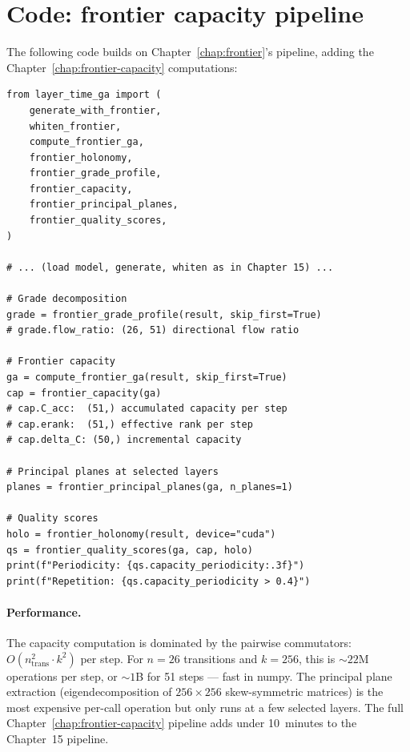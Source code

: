 \documentclass[11pt, twoside, openright]{memoir}
\numberwithin{equation}{chapter}
\begin{document}
\section{Code: frontier capacity pipeline}
\label{sec:cap-code}

The following code builds on Chapter~\ref{chap:frontier}'s
pipeline, adding the Chapter~\ref{chap:frontier-capacity} computations:

\begin{lstlisting}[caption={Frontier capacity pipeline}]
from layer_time_ga import (
    generate_with_frontier,
    whiten_frontier,
    compute_frontier_ga,
    frontier_holonomy,
    frontier_grade_profile,
    frontier_capacity,
    frontier_principal_planes,
    frontier_quality_scores,
)

# ... (load model, generate, whiten as in Chapter 15) ...

# Grade decomposition
grade = frontier_grade_profile(result, skip_first=True)
# grade.flow_ratio: (26, 51) directional flow ratio

# Frontier capacity
ga = compute_frontier_ga(result, skip_first=True)
cap = frontier_capacity(ga)
# cap.C_acc:  (51,) accumulated capacity per step
# cap.erank:  (51,) effective rank per step
# cap.delta_C: (50,) incremental capacity

# Principal planes at selected layers
planes = frontier_principal_planes(ga, n_planes=1)

# Quality scores
holo = frontier_holonomy(result, device="cuda")
qs = frontier_quality_scores(ga, cap, holo)
print(f"Periodicity: {qs.capacity_periodicity:.3f}")
print(f"Repetition: {qs.capacity_periodicity > 0.4}")
\end{lstlisting}

\paragraph{Performance.}
The capacity computation is dominated by the pairwise commutators:
$O(n_{\text{trans}}^2 \cdot k^2)$ per step.  For $n = 26$
transitions and $k = 256$, this is $\sim\!22$M operations per step,
or $\sim\!1$B for 51 steps --- fast in numpy.
The principal plane extraction (eigendecomposition of
$256 \times 256$ skew-symmetric matrices) is the most expensive
per-call operation but only runs at a few selected layers.
The full Chapter~\ref{chap:frontier-capacity} pipeline adds under 10~minutes to the
Chapter~15 pipeline.
\end{document}
